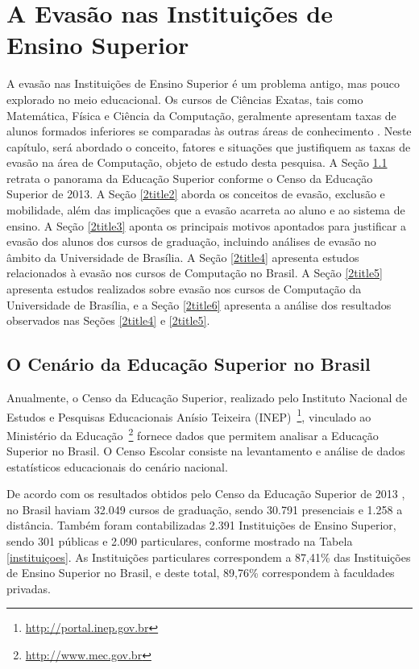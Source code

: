 \chapter{A Evasão nas Instituições de Ensino Superior} \label{2title}

A evasão nas Instituições de Ensino Superior é um problema antigo, mas pouco explorado no meio educacional. Os cursos de Ciências Exatas, tais como Matemática, Física e Ciência da Computação, geralmente apresentam taxas de alunos formados inferiores se comparadas às outras áreas de conhecimento \citep{censo2013}. Neste capítulo, será abordado o conceito, fatores e situações que justifiquem as taxas de evasão na área de Computação, objeto de estudo desta pesquisa. A Seção \ref{2title1} retrata o panorama da Educação Superior conforme o Censo da Educação Superior de 2013. A Seção \ref{2title2} aborda os conceitos de evasão, exclusão e mobilidade, além das implicações que a evasão acarreta ao aluno e ao sistema de ensino. A Seção \ref{2title3} aponta os principais motivos apontados para justificar a evasão dos alunos dos cursos de graduação, incluindo análises de evasão no âmbito da Universidade de Brasília. A Seção \ref{2title4} apresenta estudos relacionados à evasão nos cursos de Computação no Brasil. A Seção \ref{2title5} apresenta estudos realizados sobre evasão nos cursos de Computação da Universidade de Brasília, e a Seção \ref{2title6} apresenta a análise dos resultados observados nas  Seções \ref{2title4} e \ref{2title5}. 

\section{O Cenário da Educação Superior no Brasil} \label{2title1}

Anualmente, o Censo da Educação Superior, realizado pelo Instituto Nacional de Estudos e Pesquisas Educacionais Anísio Teixeira (INEP)~\footnote{\url{http://portal.inep.gov.br}}, vinculado ao Ministério da Educação~\footnote{\url{http://www.mec.gov.br}} fornece dados que permitem analisar a Educação Superior no Brasil. O Censo Escolar consiste na levantamento e análise de dados estatísticos educacionais do cenário nacional.

De acordo com os resultados obtidos pelo Censo da Educação Superior de 2013 \citep{censo_site}, no Brasil haviam 32.049 cursos de graduação, sendo 30.791 presenciais e 1.258 a distância. Também foram contabilizadas 2.391 Instituições de Ensino Superior, sendo 301 públicas e 2.090 particulares, conforme mostrado na Tabela \ref{instituiçoes}. As Instituições particulares correspondem a 87,41\% das Instituições de Ensino Superior no Brasil, e deste total, 89,76\% correspondem à faculdades privadas.

